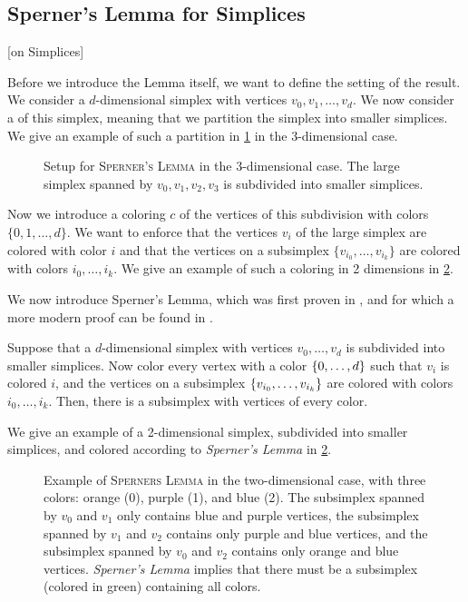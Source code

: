\subsection{Sperner's Lemma for Simplices}[on Simplices]

Before we introduce the Lemma itself, we want to define the setting of the result. We consider a $d$-dimensional simplex with vertices $v_0, v_1, \dots, v_d$. We now consider a  of this simplex, meaning that we partition the simplex into smaller simplices. We give an example of such a partition in \cref{fig:sperner_setup_example} in the 3-dimensional case.

\begin{figure}[ht]
    \centering
    \caption[Setup for \textsc{Sperner's Lemma}]{Setup for \textsc{Sperner's Lemma} in the 3-dimensional case. The large simplex spanned by $v_0, v_1, v_2, v_3$ is subdivided into smaller simplices.}
    \label{fig:sperner_setup_example}
\end{figure}

Now we introduce a coloring $c$ of the vertices of this subdivision with colors $\{0, 1, \dots, d\}$. We want to enforce that the vertices $v_i$ of the large simplex are colored with color $i$ and that the vertices on a subsimplex $\{v_{i_0}, \dots, v_{i_k}\}$ are colored with colors $i_0, \dots, i_k$. We give an example of such a coloring in 2 dimensions in \cref{fig:sperner_lemma_example}.

We now introduce Sperner's Lemma, which was first proven in , and for which a more modern proof can be found in .
\begin{theorem}
    Suppose that a $d$-dimensional simplex with vertices $v_0, \dots, v_d$ is subdivided into smaller simplices. Now color every vertex with a color $\left\{0, \dots, d\right\}$ such that $v_i$ is colored $i$, and the vertices on a subsimplex $\left\{v_{i_0}, \dots, v_{i_k}\right\}$ are colored with colors $i_0, \dots, i_k$. Then, there is a subsimplex with vertices of every color.
\end{theorem}

We give an example of a 2-dimensional simplex, subdivided into smaller simplices, and colored according to \textit{Sperner's Lemma} in \cref{fig:sperner_lemma_example}.

\begin{figure}[ht]
    \centering
    \caption[Example of \textsc{Sperners Lemma}]{Example of \textsc{Sperners Lemma} in the two-dimensional case, with three colors: orange (0), purple (1), and blue (2). The subsimplex spanned by $v_0$ and $v_1$ only contains blue and purple vertices, the subsimplex spanned by $v_1$ and $v_2$ contains only purple and blue vertices, and the subsimplex spanned by $v_0$ and $v_2$ contains only orange and blue vertices. \textit{Sperner's Lemma} implies that there must be a subsimplex (colored in green) containing all colors.}
    \label{fig:sperner_lemma_example}
\end{figure}

